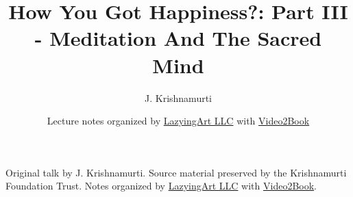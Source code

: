 \documentclass[11pt,oneside]{book}
\begin{document}
\frontmatter
\title{How You Got Happiness?: Part III - Meditation And The Sacred Mind}
\author{J. Krishnamurti}
\date{Lecture notes organized by \href{https://lazying.art}{LazyingArt LLC} with \href{https://github.com/lachlanchen/Video2Book}{Video2Book}}
\maketitle
\begin{center}
\small Original talk by J. Krishnamurti. Source material preserved by the Krishnamurti Foundation Trust. Notes organized by \href{https://lazying.art}{LazyingArt LLC} with \href{https://github.com/lachlanchen/Video2Book}{Video2Book}.
\end{center}
\clearpage
\mainmatter

\end{document}
